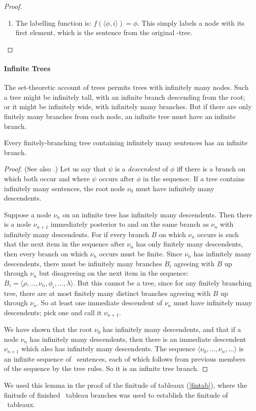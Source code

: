 \begin{theorem}
\begin{proof}
\begin{enumerate}
			\item The labelling function is: $f(\langle \phi,i\rangle) = \phi$. This simply labels a node with its first element, which is the sentence from the original \lone-tree.			
		\end{enumerate}
	\end{proof}
\end{theorem}

\paragraph{Infinite Trees} The set-theoretic account of trees permits trees with infinitely many nodes. Such a tree might be infinitely tall, with an infinite branch descending from the root; or it might be infinitely wide, with infinitely many branches. But if there are only finitely many branches from each node, an infinite tree must have an infinite branch.
\begin{lemma}\label{konig}
	Every finitely-branching tree containing infinitely many sentences has an infinite branch. \begin{proof} (See also \citet[152]{bevpospa}.) Let us say that $\psi$ is a \emph{descendent} of $\phi$ iff there is a branch on which both occur and where $\psi$ occurs after $\phi$ in the sequence. If a tree contains infinitely many sentences, the root node $\nu_{0}$ must have infinitely many descendents. 

	Suppose a node $\nu_{n}$ on an infinite tree has infinitely many descendents. Then there is a node $\nu_{n+1}$ immediately posterior to and on the same branch as $\nu_{n}$ with infinitely many descendents. For if every branch $B$ on which $\nu_{n}$ occurs is such that the next item in the sequence after $\nu_{n}$ has only finitely many descendents, then every branch on which $\nu_{n}$ occurs must be finite. Since $\nu_{n}$ has infinitely many descendents, there must be infinitely many branches $B_{i}$ agreeing with $B$ up through $\nu_{n}$ but disagreeing on the next item in the sequence: $B_{i} = \langle \rho,…,\nu_{n},\phi_{i},…,\lambda\rangle$. But this cannot be a tree, since for any finitely branching tree, there are at most finitely many distinct branches agreeing with $B$ up through $\nu_{n}$. So at least one immediate descendent of $\nu_{n}$ must have infinitely many descendents; pick one and call it $\nu_{n+1}$.

	We have shown that the root $\nu_{0}$ has infinitely many descendents, and that if a node $\nu_{n}$ has infinitely many descendents, then there is an immediate descendent $\nu_{n+1}$ which also has infinitely many descendents. The sequence $\langle \nu_{0},…,\nu_{n},…\rangle$ is an infinite sequence of \lone\ sentences,  each of which follows from previous members of the sequence by the tree rules. So it is an infinite tree branch.
	\end{proof}
\end{lemma}
We used this lemma in the proof of the finitude of tableaux (\autoref{fintab}), where the finitude of finished \lone\ tableau branches was used to establish the finitude of \lone\ tableaux.



